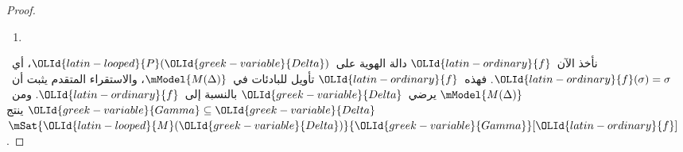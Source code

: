 \documentclass[../../../include/open-logic-section]{subfiles}
\begin{document}
\begin{proof}
\begin{enumerate}
{{      وإذا كان $\sFmla{\False}{\indfrm}[\sigma] \in {\OLId{greek-variable}{Delta}}$، فلبعض
      $\sigma.{\OLId{latin-ordinary}{n}}$ يكون $\sFmla{\False}{!B}[\sigma.{\OLId{latin-ordinary}{n}}] \in {\OLId{greek-variable}{Delta}}$ لأن
      الفرع تام. وبفرض الاستقراء،
      $\mSat/{{\OLId{latin-looped}{M}}({\OLId{greek-variable}{Delta}})}{!B}[\sigma.{\OLId{latin-ordinary}{n}}]$. ولأن
      ${\OLId{latin-looped}{R}}\sigma(\sigma.{\OLId{latin-ordinary}{n}})$، توجد~$\sigma'$ بحيث
      $\mSat/{{\OLId{latin-looped}{M}}({\OLId{greek-variable}{Delta}})}{!B}[\sigma']$. ومن ثم
      $\mSat/{{\OLId{latin-looped}{M}}({\OLId{greek-variable}{Delta}})}{\indfrm}[\sigma]$.}}
  \item {}
\end{enumerate}
نأخذ الآن~${\OLId{latin-ordinary}{f}}$ دالة الهوية على~${\OLId{latin-looped}{P}}({\OLId{greek-variable}{Delta}})$، أي~${\OLId{latin-ordinary}{f}}(\sigma)=\sigma$.
فهذه~${\OLId{latin-ordinary}{f}}$ تأويل للبادئات في~$\mModel{M(\Delta)}$، والاستقراء المتقدم
يثبت أن~$\mModel{M(\Delta)}$ يرضي~${\OLId{greek-variable}{Delta}}$ بالنسبة إلى~${\OLId{latin-ordinary}{f}}$.
ومن~${\OLId{greek-variable}{Gamma}} \subseteq {\OLId{greek-variable}{Delta}}$ ينتج~$\mSat{{\OLId{latin-looped}{M}}({\OLId{greek-variable}{Delta}})}{{\OLId{greek-variable}{Gamma}}}[{\OLId{latin-ordinary}{f}}]$.
\end{proof}
\end{document}
